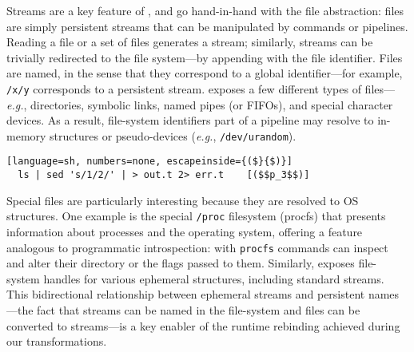 \documentclass[sigplan,10pt,review,anonymous]{acmart}
\newcommand{\eg}{{\em e.g.}, }
\newcommand{\ttt}[1]{\texttt{\small #1}}
\begin{document}
Streams are a key feature of \unix, and go hand-in-hand with the file abstraction:
  files are simply persistent streams that can be manipulated by commands or pipelines.
Reading a file or a set of files generates a stream; 
  similarly, streams can be trivially redirected to the file system---by appending with the file identifier.
Files are named, in the sense that they correspond to a global identifier---for example, \ttt{/x/y} corresponds to a persistent stream.
\unix exposes a few different types of files---\eg directories, symbolic links, named pipes (or FIFOs), and special character devices.
As a result, file-system identifiers part of a pipeline may resolve to in-memory structures or pseudo-devices (\eg \ttt{/dev/urandom}).

\smallskip
\begin{lstlisting}[language=sh, numbers=none, escapeinside={($}{$)}]
  ls | sed 's/1/2/' | > out.t 2> err.t    [($$p_3$$)]
\end{lstlisting}
\smallskip

\noindent
Special files are particularly interesting because they are resolved to OS structures.
One example is the special \ttt{/proc} filesystem (procfs) that presents information about processes and the operating system, offering a feature analogous to programmatic introspection:
  with \ttt{procfs} commands can inspect and alter their directory or the flags passed to them.
Similarly, \unix exposes file-system handles for various ephemeral structures, including standard streams.
This bidirectional relationship between ephemeral streams and persistent names---the fact that streams can be named in the file-system and files can be converted to streams---is a key enabler of the runtime rebinding achieved during our transformations.
\end{document}
